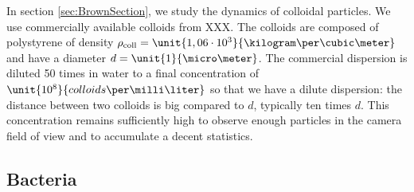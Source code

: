 \documentclass[%
 aip,
 jmp,%
 amsmath,amssymb,
reprint,%
]{revtex4-1}
\begin{document}
In section \ref{sec:BrownSection}, we study the dynamics of colloidal particles. We use commercially available colloids from XXX. The colloids are composed of polystyrene of density $\rho_\text{coll} = \unit{1,06\cdot10^3}{\kilogram\per\cubic\meter}$ and have a diameter $d = \unit{1}{\micro\meter}$. The commercial dispersion is diluted 50 times in water to a final concentration of $\unit{10^8}{colloids\per\milli\liter}$ so that we have a dilute dispersion: the distance between two colloids is big compared to $d$, typically ten times $d$. This concentration remains sufficiently high to observe enough particles in the camera field of view and to accumulate a decent statistics.



\subsection{Bacteria}
\end{document}
